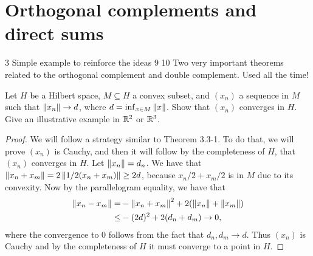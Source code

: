 \section{Orthogonal complements and direct sums}

3 Simple example to reinforce the ideas
9
10 Two very important theorems related to the orthogonal complement and double complement. Used all the time!

\begin{exercise}{1}
Let $H$ be a Hilbert space, $M \subseteq H$ a convex subset, and $(x_n)$ a sequence in $M$ such that $\left\lVert x_n\right\rVert \to d$, where $d = \inf_{x \in M} \left\lVert x\right\rVert$.
Show that $(x_n)$ converges in $H$.
Give an illustrative example in $\mathbb{R}^2$ or $\mathbb{R}^3$.
\end{exercise}
\begin{proof}
We will follow a strategy similar to Theorem 3.3-1.
To do that, we will prove $(x_n)$ is Cauchy, and then it will follow by the completeness of $H$, that $(x_n)$ converges in $H$.
Let $\left\lVert x_n\right\rVert = d_n$.
We have that $\left\lVert x_n + x_m\right\rVert = 2\left\lVert 1/2(x_n + x_m)\right\rVert \geq 2d$, because $x_n/2 + x_m/2$ is in $M$ due to its convexity.
Now by the parallelogram equality, we have that
\begin{align*}
    \left\lVert x_n - x_m\right\rVert 
    =& -\left\lVert x_n + x_m\right\rVert^2 + 2(\left\lVert x_n\right\rVert + \left\lVert x_m\right\rVert)\\
    \leq& -(2d)^2 + 2(d_n + d_m) \to 0,
\end{align*}
where the convergence to 0 follows from the fact that $d_n,d_m \to d$.
Thus $(x_n)$ is Cauchy and by the completeness of $H$ it must converge to a point in $H$.
\end{proof}

